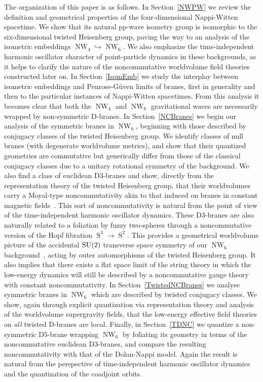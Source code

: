 \documentclass[11pt,a4paper]{article}
\DeclareMathOperator{\Sphere}{S}
\DeclareMathOperator{\NW}{NW}
\let\S\Sphere
\begin{document}
The organization of this paper is as follows. In Section~\ref{NWPW}
we review the definition and geometrical properties of the
four-dimensional Nappi-Witten spacetime. We show that its natural
pp-wave isometry group is isomorphic to the six-dimensional twisted
Heisenberg group, paving the way to an analysis of the isometric
embeddings $\NW_4\hookrightarrow\NW_6$. We also emphasize the
time-independent harmonic oscillator character of point-particle
dynamics in these backgrounds, as it helps to clarify the nature of
the noncommutative worldvolume field theories constructed later on. In
Section~\ref{IsomEmb} we study the interplay between isometric
embeddings and Penrose-G\"uven limits of branes, first in generality
and then to the particular instances of Nappi-Witten spacetimes. From
this analysis it becomes clear that both the $\NW_4$ and $\NW_6$
gravitational waves are necessarily wrapped by non-symmetric D-branes.
In Section~\ref{NCBranes} we begin our analysis of the symmetric
branes in $\NW_6$, beginning with those described by conjugacy classes
of the twisted Heisenberg group. We identify classes of null branes
(with degenerate worldvolume metrics), and show that their quantized
geometries are commutative but generically differ from those of the
classical conjugacy classes due to a unitary rotational
symmetry of the background. We also find a class of euclidean
D3-branes and show, directly from the representation theory of the
twisted Heisenberg group, that their worldvolumes carry a Moyal-type
noncommutativity akin to that induced on branes in constant magnetic
fields~\cite{DNek1,SW1,Sz1,Sz2}. This sort of noncommutativity is
natural from the point of view of the time-independent harmonic
oscillator dynamics. These D3-branes are also naturally related to a
foliation by fuzzy two-spheres through a noncommutative version of the
Hopf fibration $\S^3\to\S^2$. This provides a geometrical worldvolume
picture of the accidental ${\rm SU}(2)$ transverse space symmetry of
our $\NW_6$ background~\cite{BAKZ1}, acting by outer automorphisms of
the twisted Heisenberg group. It also implies that there exists a flat
space limit of the string theory in which the low-energy dynamics will
still be described by a noncommutative gauge theory with constant
noncommutativity. In Section~\ref{TwistedNCBranes} we analyse
symmetric branes in $\NW_6$ which are described by twisted conjugacy
classes. We show, again through explicit quantization via
representation theory and analysis of the worldvolume supergravity
fields, that the low-energy effective field theories on {\it all}
twisted D-branes are local. Finally, in Section~\ref{TDNC} we quantize
a non-symmetric D5-brane wrapping $\NW_6$ by foliating its geometry in
terms of the noncommutative euclidean D3-branes, and compare the
resulting noncommutativity with that of the Dolan-Nappi model. Again
the result is natural from the perspective of time-independent
harmonic oscillator dynamics and the quantization of the coadjoint
orbits.
\end{document}
